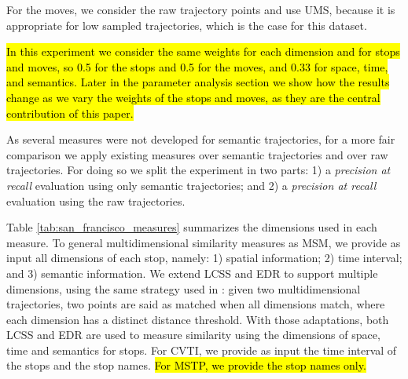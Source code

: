 \documentclass[12pt]{article}
\begin{document}
For the moves, we consider the raw trajectory points and use UMS, because it is appropriate for low sampled trajectories, which is the case for this dataset. %

\hl{In this experiment we consider the same weights for each dimension and for stops and moves, so 0.5 for the stops and 0.5 for the moves, and 0.33 for space, time, and semantics. Later in the parameter analysis section we show how the results change as we vary the weights of the stops and moves, as they are the central contribution of this paper.}

As several measures were not developed for semantic trajectories, for a more fair comparison we apply existing measures over semantic trajectories and over raw trajectories. For doing so we split the experiment in two parts: 1) a \textit{precision at recall} evaluation using only semantic trajectories; and 2) a \textit{precision at recall} evaluation using the raw trajectories.%

Table {\ref{tab:san_francisco_measures}} summarizes the dimensions used in each measure. To general multidimensional similarity measures as MSM, we provide as input all dimensions of each stop, namely: 1) spatial information; 2) time interval; and 3) semantic information. We extend LCSS and EDR to support multiple dimensions, using the same strategy used in {\cite{Furtado:TGIS12156}}: given two multidimensional trajectories, two points are said as matched when all dimensions match, where each dimension has a distinct distance threshold. With those adaptations, both LCSS and EDR are used to measure similarity using the dimensions of space, time and semantics for stops. For CVTI, we provide as input the time interval of the stops and the stop names. \hl{For MSTP, we provide the stop names only.}
\end{document}
